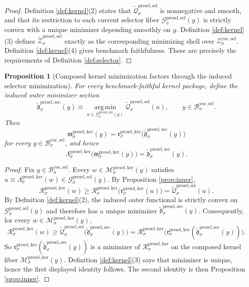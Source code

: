 \documentclass[11pt]{article}
\newcommand{\YoctoSelectorBody}[1]{\mathcal B_{#1}^{\mathrm{yoc,sel}}}
\newcommand{\YoctoSelectorShell}[1]{\mathcal Z_{#1}^{\mathrm{yoc,sel}}}
\newcommand{\PreSectionSelectorFiber}[2]{\mathcal G_{#1}^{\mathrm{presel,sel}}(#2)}
\newcommand{\KernelProj}[1]{\Lambda_{#1}^{\mathrm{presel,ker}}}
\newcommand{\KernelFunctional}[1]{\mathscr R_{#1}^{\mathrm{presel,ker}}}
\newcommand{\KernelMinLift}[1]{\mathfrak r_{#1}^{\mathrm{presel,ker}}}
\newcommand{\KernelComposedFiber}[2]{\mathcal M_{#1}^{\mathrm{presel,ker}}(#2)}
\newcommand{\KernelComposedMin}[1]{\mathfrak m_{#1}^{\mathrm{presel,ker}}}
\newcommand{\InducedSelectorFunctional}[1]{\widetilde{\mathscr Q}_{#1}^{\mathrm{presel,sel}}}
\newcommand{\InducedSelectorShell}[1]{\widetilde{\mathcal Z}_{#1}^{\mathrm{presel,sel}}}
\newcommand{\InducedPreSelectorMinSection}[1]{\widetilde{\mathfrak d}_{#1}^{\mathrm{presel,sec}}}
\newtheorem{proposition}{Proposition}
\begin{document}
\begin{proof}
Definition \ref{def:kernel}(2) states that \(\InducedSelectorFunctional{\sigma}\) is nonnegative and smooth, and that its restriction to each current selector fiber \(\PreSectionSelectorFiber{\sigma}{y}\) is strictly convex with a unique minimizer depending smoothly on \(y\). Definition \ref{def:kernel}(3) defines \(\InducedSelectorShell{\sigma}\) exactly as the corresponding minimizing shell over \(\YoctoSelectorShell{\sigma}\). Definition \ref{def:kernel}(4) gives benchmark faithfulness. These are precisely the requirements of Definition \ref{def:selector}.
\end{proof}

\begin{proposition}[Composed kernel minimization factors through the induced selector minimization]
\label{prop:factor}
For every benchmark-faithful kernel package, define the induced outer minimizer section
\[
\InducedPreSelectorMinSection{\sigma}(y)
\equiv
\operatorname*{arg\,min}_{u\in\PreSectionSelectorFiber{\sigma}{y}}
\InducedSelectorFunctional{\sigma}(u),
\qquad
y\in\YoctoSelectorBody{\sigma}.
\]
Then
\[
\KernelComposedMin{\sigma}(y)
=
\KernelMinLift{\sigma}\bigl(\InducedPreSelectorMinSection{\sigma}(y)\bigr)
\]
for every \(y\in\YoctoSelectorBody{\sigma}\), and hence
\[
\KernelProj{\sigma}\bigl(\KernelComposedMin{\sigma}(y)\bigr)
=
\InducedPreSelectorMinSection{\sigma}(y).
\]
\end{proposition}

\begin{proof}
Fix \(y\in\YoctoSelectorBody{\sigma}\). Every \(w\in\KernelComposedFiber{\sigma}{y}\) satisfies \(u\equiv\KernelProj{\sigma}(w)\in\PreSectionSelectorFiber{\sigma}{y}\). By Proposition \ref{prop:inner},
\[
\KernelFunctional{\sigma}(w)
\geq
\KernelFunctional{\sigma}\bigl(\KernelMinLift{\sigma}(u)\bigr)
=
\InducedSelectorFunctional{\sigma}(u).
\]
By Definition \ref{def:kernel}(2), the induced outer functional is strictly convex on \(\PreSectionSelectorFiber{\sigma}{y}\) and therefore has a unique minimizer \(\InducedPreSelectorMinSection{\sigma}(y)\). Consequently, for every \(w\in\KernelComposedFiber{\sigma}{y}\),
\[
\KernelFunctional{\sigma}(w)
\geq
\InducedSelectorFunctional{\sigma}\bigl(\InducedPreSelectorMinSection{\sigma}(y)\bigr)
=
\KernelFunctional{\sigma}\bigl(\KernelMinLift{\sigma}(\InducedPreSelectorMinSection{\sigma}(y))\bigr).
\]
So \(\KernelMinLift{\sigma}(\InducedPreSelectorMinSection{\sigma}(y))\) is a minimizer of \(\KernelFunctional{\sigma}\) on the composed kernel fiber \(\KernelComposedFiber{\sigma}{y}\). Definition \ref{def:kernel}(3) says that minimizer is unique, hence the first displayed identity follows. The second identity is then Proposition \ref{prop:inner}.
\end{proof}
\end{document}
